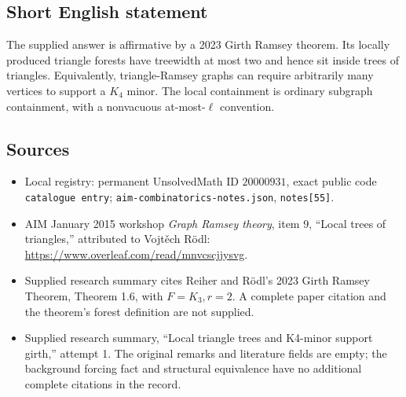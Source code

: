 \documentclass[11pt]{article}
\begin{document}
\subsection{Short English statement}
The supplied answer is affirmative by a 2023 Girth Ramsey theorem. Its locally produced triangle forests have treewidth at most two and hence sit inside trees of triangles. Equivalently, triangle-Ramsey graphs can require arbitrarily many vertices to support a \(K_4\) minor. The local containment is ordinary subgraph containment, with a nonvacuous at-most-\(\ell\) convention.
\subsection{Sources}
\begin{itemize}
\item Local registry: permanent UnsolvedMath ID \(20000931\), exact public code \texttt{catalogue entry}; \texttt{aim-combinatorics-notes.json}, \texttt{notes[55]}.
\item AIM January 2015 workshop \emph{Graph Ramsey theory}, item 9, ``Local trees of triangles,'' attributed to Vojt\v{e}ch R\"odl: \url{https://www.overleaf.com/read/mnvcscjjysvg}.
\item Supplied research summary cites Reiher and R\"odl's 2023 Girth Ramsey Theorem, Theorem 1.6, with \(F=K_3,r=2\). A complete paper citation and the theorem's forest definition are not supplied.
\item Supplied research summary, ``Local triangle trees and K4-minor support girth,'' attempt 1. The original remarks and literature fields are empty; the background forcing fact and structural equivalence have no additional complete citations in the record.
\end{itemize}
\end{document}
